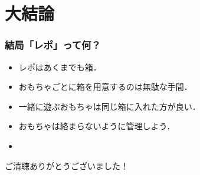 \section{大結論}

\begin{frame}
    \frametitle{結局「レポ」って何？}
    \begin{itemize}
        \item<2-> レポはあくまでも箱．
        \item<3-> おもちゃごとに箱を用意するのは無駄な手間．
        \item<4-> 一緒に遊ぶおもちゃは同じ箱に入れた方が良い．
        \item<5-> おもちゃは絡まらないように管理しよう．
        \item<6-> 
    \end{itemize}
\end{frame}

\begin{frame}
    \LARGE
    ご清聴ありがとうございました！
\end{frame}
